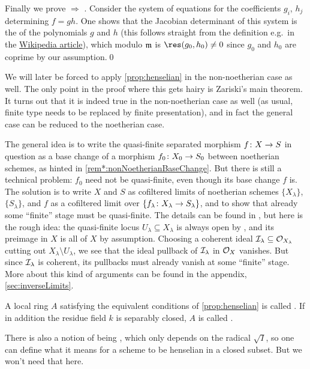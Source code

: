 	Finally we prove  $\Rightarrow$ . Consider the system of equations for the coefficients $g_i$, $h_j$ determining $f=gh$. One shows that the Jacobian determinant of this system is the  of the polynomials $g$ and $h$ (this follows straight from the definition e.g.\ in the \href{https://en.wikipedia.org/wiki/Resultant}{Wikipedia article}), which modulo $\mathfrak{m}$ is $\res(g_0,h_0)\neq 0$ since $g_0$ and $h_0$ are coprime by our assumption.\qed
\begin{rem}\label{rem:nonNoetherian}
	We will later be forced to apply \cref{prop:henselian} in the non-noetherian case as well. The only point in the proof where this gets hairy is Zariski's main theorem. It turns out that it is indeed true in the non-noetherian case as well (as usual, finite type needs to be replaced by finite presentation), and in fact the general case can be reduced to the noetherian case.
	
	The general idea is to write the quasi-finite separated morphism $f\colon X\morphism S$ in question as a base change of a morphism $f_0\colon X_0\morphism S_0$ between noetherian schemes, as hinted in \cref{rem*:nonNoetherianBaseChange}. But there is still a technical problem: $f_0$ need not be quasi-finite, even though its base change $f$ is. The solution is to write $X$ and $S$ as cofiltered limits of noetherian schemes $\{X_\lambda\}$, $\{S_\lambda\}$, and $f$ as a cofiltered limit over $\{f_\lambda\colon X_\lambda\morphism S_\lambda\}$, and to show that already some \enquote{finite} stage must be quasi-finite. The details can be found in \cite[Théorème~(8.10.5)]{egaIV3}, but here is the rough idea: the quasi-finite locus $U_\lambda\subseteq X_\lambda$ is always open by \cite[Theorem~2]{jacobians}, and its preimage in $X$ is all of $X$ by assumption. Choosing a coherent ideal $\mathcal{I}_\lambda\subseteq \mathcal{O}_{X_\lambda}$ cutting out $X_\lambda\setminus U_\lambda$, we see that the ideal pullback of $\mathcal{I}_\lambda$ in $\mathcal{O}_X$ vanishes. But since $\mathcal{I}_\lambda$ is coherent, its pullbacks must already vanish at some \enquote{finite} stage. More about this kind of arguments can be found in the appendix, \cref{sec:inverseLimits}.
\end{rem}
\begin{defi}\label{def:henselian}
	A local ring $A$ satisfying the equivalent conditions of \cref{prop:henselian} is called . If in addition the residue field $k$ is separably closed, $A$ is called .
\end{defi}
There is also a notion of being , which only depends on the radical $\sqrt{I}$, so one can define what it means for a scheme to be henselian in a closed subset. But we won't need that here.

